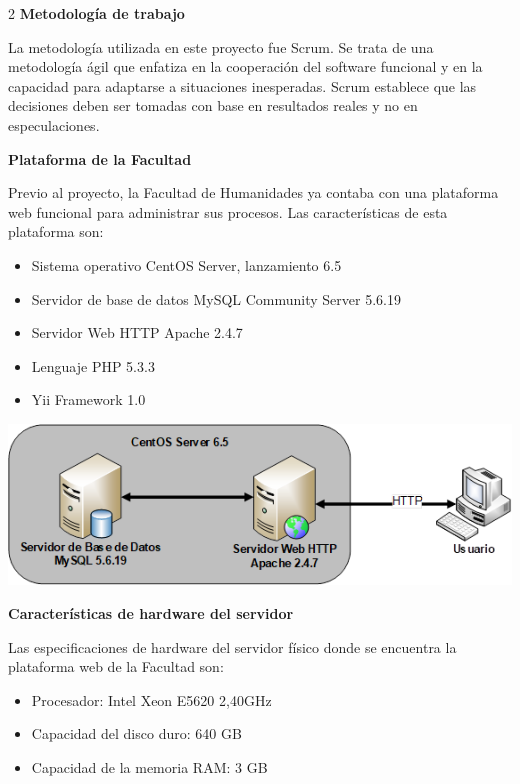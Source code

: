 \documentclass[12pt,spanish,Letterpaper,openany]{book}
\providecommand{\tightlist}{%
  \setlength{\itemsep}{0pt}\setlength{\parskip}{0pt}}
\newcommand{\spacethreemilis}{\vspace{3mm}}
\begin{document}
\begin {multicols}{2}
\textbf{Metodología de trabajo}

La metodología utilizada en este proyecto fue Scrum. Se trata de una metodología ágil que enfatiza en la cooperación del software funcional y en la capacidad para adaptarse a situaciones inesperadas. Scrum establece que las decisiones deben ser tomadas con base en resultados reales y no en especulaciones.

\textbf{Plataforma de la Facultad}

Previo al proyecto, la Facultad de Humanidades ya contaba con una plataforma web funcional para administrar sus procesos. Las características de esta plataforma son:

\begin{itemize}
\tightlist
\item
  Sistema operativo CentOS Server, lanzamiento 6.5
\item
  Servidor de base de datos MySQL Community Server 5.6.19
\item
  Servidor Web HTTP Apache 2.4.7
\item
  Lenguaje PHP 5.3.3
\item
  Yii Framework 1.0
\end{itemize}

\begin {flushleft}
\noindent\begin{minipage}[c]{\columnwidth}

\includegraphics[width=0.94\linewidth]{images/image02_rherrera}

\end{minipage}

\end {flushleft}

\spacethreemilis

\textbf{Características de hardware del servidor}

Las especificaciones de hardware del servidor físico donde se encuentra la plataforma web de la Facultad son:

\begin{itemize}
\tightlist
\item
  Procesador: Intel Xeon E5620 2,40GHz
\item
  Capacidad del disco duro: 640 GB
\item
  Capacidad de la memoria RAM: 3 GB
\end{itemize}


\end{multicols}
\end{document}
